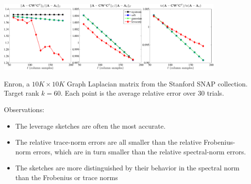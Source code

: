\documentclass[xcolor=x11names,compress,ignorenonframetext]{beamer}
\renewcommand{\(}{\begin{columns}}
\renewcommand{\)}{\end{columns}}
\newcommand{\<}[1]{\begin{column}{#1}}
\renewcommand{\>}{\end{column}}
\begin{document}
\begin{frame}
 
 \centerline{\includegraphics[width=4.5in, keepaspectratio=true]{Enronrank60exact-methods-nonfixed-rank-errors}}
 Enron, a $10K \times 10K$ Graph Laplacian matrix from the Stanford SNAP collection. Target
 rank $k = 60.$ Each point is the average relative error over 30 trials.
\end{frame}

\begin{frame}
Observations:
\begin{itemize}
 \item The leverage sketches are often the most accurate.
 \item The relative trace-norm errors are all smaller than the relative Frobenius-norm errors, which are in turn 
 smaller than the relative spectral-norm errors.
 \item The sketches are more distinguished by their behavior in the spectral norm than the Frobenius or trace norms
\end{itemize}

\end{frame}
\end{document}
